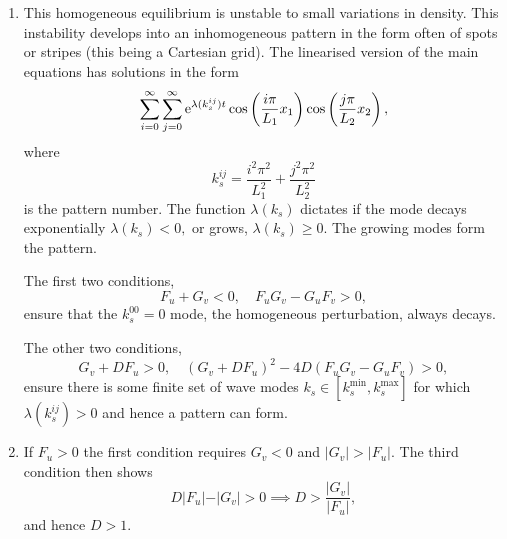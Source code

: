 \documentclass[a4paper, 12pt]{article}
\begin{document}
\begin{enumerate}[label={\bf \arabic{*}.\;}, ref={\arabic{*}},itemsep=3ex, left=0ex]
{\begin{enumerate}[label=(\alph*)]
        \item This homogeneous equilibrium is unstable to small variations in density. This instability develops into an inhomogeneous pattern in the form often of spots or stripes (this being a Cartesian grid). The linearised version of the main equations has solutions in the form
          \begin{equation}
            \sum_{i=0}^{\infty}\sum_{j=0}^{\infty}\mathrm{e}^{\lambda(k_s^{ij}) t}\cos\left(\frac{ i \pi}{L_1}x_1\right)\cos\left(\frac{ j\pi}{L_2}x_2\right),
          \end{equation}
          where
          \begin{equation}
            k_s^{ij} = \frac{ i^2\pi^2}{L_1^2}+\frac{j^2\pi^2}{L_2^2}
          \end{equation}
          is the pattern number.
          The function $\lambda(k_s)$ dictates if the mode decays exponentially $\lambda(k_s)<0,$ or grows, $\lambda(k_s)\geq 0$. The growing modes form the pattern.

          The first two conditions,
          \begin{equation}
            F_u +G_v <0, \quad F_uG_v  -G_u F_v> 0,
          \end{equation}
          ensure that the $k_s^{00}=0$ mode, the homogeneous perturbation, always decays.

          The other two conditions,
          \begin{equation}
            G_v + DF_u>0,\quad (G_v+ D F_u)^2 - 4 D (F_uG_v  -G_uF_v)>0,
          \end{equation}
          ensure there is some finite set of wave modes $k_s\in[k_s^{\min},k_s^{\max}]$ for which $\lambda(k_s^{ij})>0$ and hence a pattern can form.

        \item
          If $F_u>0$ the first condition requires $G_v<0$ and $\vert G_v\vert> \vert F_u\vert$. The third condition then shows
          \begin{equation}
            D \vert F_u\vert - \vert G_v\vert >0 \implies
            D>  \frac{\vert G_v\vert}{\vert F_u\vert},
          \end{equation}
          and hence $D>1$.

      \end{enumerate}

    }



\end{enumerate}
\end{document}
